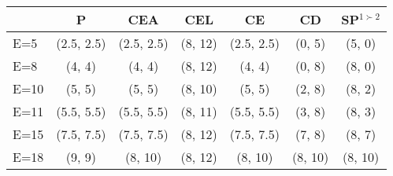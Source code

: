\begin{enumerate}
	\begin{center}
	    \begin{tabular}{|l|c|c|c|c|c|c|}
		\hline 
		& P & CEA & CEL & CE & CD & SP$^{1\succ 2}$ \\ 
		\hline 
		E=5 & (2.5, 2.5) & (2.5, 2.5) & (8, 12) & (2.5, 2.5) & (0, 5) & (5, 0) \\
		E=8 & (4, 4) & (4, 4) & (8, 12) & (4, 4) & (0, 8) & (8, 0) \\ 
		E=10 & (5, 5) & (5, 5) & (8, 10) & (5, 5) & (2, 8) & (8, 2) \\ 
		E=11 & (5.5, 5.5) & (5.5, 5.5) & (8, 11) & (5.5, 5.5) & (3, 8) & (8, 3) \\ 
		E=15 & (7.5, 7.5) & (7.5, 7.5) & (8, 12) & (7.5, 7.5) & (7, 8) & (8, 7) \\ 
		E=18 & (9, 9) & (8, 10) & (8, 12) & (8, 10) & (8, 10) & (8, 10) \\ 
		\hline 
	    \end{tabular} 
	\end{center}

	\begin{center}
	\end{center}

\end{enumerate}
